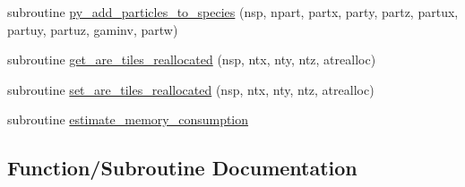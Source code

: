 \begin{DoxyCompactItemize}
\item 
subroutine \hyperlink{namespacetiling_a7d2954e264909ff996bff6096932a53d}{py\+\_\+add\+\_\+particles\+\_\+to\+\_\+species} (nsp, npart, partx, party, partz,                                                       partux, partuy, partuz, gaminv, partw)
\item 
subroutine \hyperlink{namespacetiling_a74f93e807809bce73965e51431a8f8c7}{get\+\_\+are\+\_\+tiles\+\_\+reallocated} (nsp, ntx, nty, ntz, atrealloc)
\item 
subroutine \hyperlink{namespacetiling_a9ac073551919a3ca368f58e56b9370e6}{set\+\_\+are\+\_\+tiles\+\_\+reallocated} (nsp, ntx, nty, ntz, atrealloc)
\item 
subroutine \hyperlink{namespacetiling_a535146a13d8c0743eba14d150ca49199}{estimate\+\_\+memory\+\_\+consumption}
\end{DoxyCompactItemize}


\subsection{Function/\+Subroutine Documentation}
